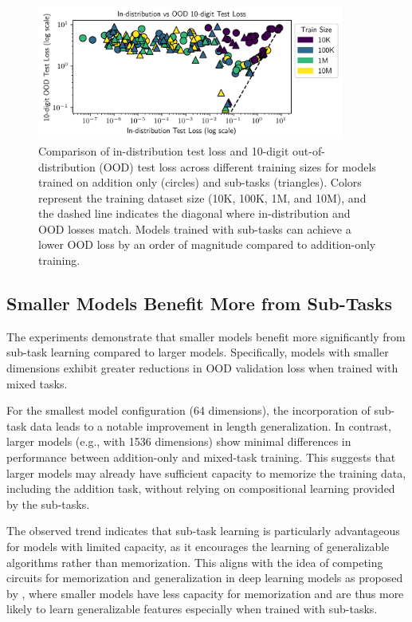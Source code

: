 \begin{figure}[htb!]
  \centering
  \includegraphics[width=0.9\textwidth]{fig/subtask_overfitting.png}
  \caption{Comparison of in-distribution test loss and 10-digit out-of-distribution (OOD) test loss across different training sizes for models trained on addition only (circles) and sub-tasks (triangles). Colors represent the training dataset size (10K, 100K, 1M, and 10M), and the dashed line indicates the diagonal where in-distribution and OOD losses match. Models trained with sub-tasks can achieve a lower OOD loss by an order of magnitude compared to addition-only training.}
  \label{fig:subtask_overfitting}
\end{figure}

\subsection{Smaller Models Benefit More from Sub-Tasks}

The experiments demonstrate that smaller models benefit more significantly from sub-task learning compared to larger models. Specifically, models with smaller dimensions exhibit greater reductions in OOD validation loss when trained with mixed tasks.

For the smallest model configuration (64 dimensions), the incorporation of sub-task data leads to a notable improvement in length generalization. In contrast, larger models (e.g., with 1536 dimensions) show minimal differences in performance between addition-only and mixed-task training. This suggests that larger models may already have sufficient capacity to memorize the training data, including the addition task, without relying on compositional learning provided by the sub-tasks.

The observed trend indicates that sub-task learning is particularly advantageous for models with limited capacity, as it encourages the learning of generalizable algorithms rather than memorization. This aligns with the idea of competing circuits for memorization and generalization in deep learning models as proposed by \cite{varma_explaining_2023}, where smaller models have less capacity for memorization and are thus more likely to learn generalizable features especially when trained with sub-tasks.

